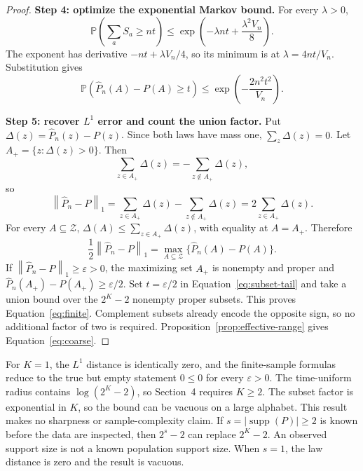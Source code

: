 \documentclass[11pt]{article}
\theoremstyle{definition}
\newcommand{\cZ}{\mathcal{Z}}
\newcommand{\Phat}{\widehat{P}}
\newcommand{\Prb}{\mathbb{P}}
\newcommand{\supp}{\operatorname{supp}}
\newcommand{\normone}[1]{\left\lVert #1\right\rVert_1}
\begin{document}
\begin{proof}
\medskip\noindent\textbf{Step 4: optimize the exponential Markov bound.}
For every $\lambda>0$,
\begin{equation}
  \Prb\!\left(\sum_aS_a\ge nt\right)
  \le
  \exp\!\left(-\lambda nt+\frac{\lambda^2V_n}{8}\right).
\end{equation}
The exponent has derivative $-nt+\lambda V_n/4$, so its minimum is at
$\lambda=4nt/V_n$.  Substitution gives
\begin{equation}\label{eq:subset-tail}
  \Prb\!\left(\Phat_n(A)-P(A)\ge t\right)
  \le
  \exp\!\left(-\frac{2n^2t^2}{V_n}\right).
\end{equation}

\medskip\noindent\textbf{Step 5: recover $L^1$ error and count the union factor.}
Put $\Delta(z)=\Phat_n(z)-P(z)$.  Since both laws have mass one,
$\sum_z\Delta(z)=0$.  Let $A_+=\{z:\Delta(z)>0\}$.  Then
\begin{equation}
  \sum_{z\in A_+}\Delta(z)
  =-\sum_{z\notin A_+}\Delta(z),
\end{equation}
so
\begin{equation}
  \normone{\Phat_n-P}
  =\sum_{z\in A_+}\Delta(z)-\sum_{z\notin A_+}\Delta(z)
  =2\sum_{z\in A_+}\Delta(z).
\end{equation}
For every $A\subseteq\cZ$,
$\Delta(A)\le\sum_{z\in A_+}\Delta(z)$, with equality at $A=A_+$.  Therefore
\begin{equation}\label{eq:tv}
  \frac12\normone{\Phat_n-P}
  =\max_{A\subseteq\cZ}\{\Phat_n(A)-P(A)\}.
\end{equation}
If $\normone{\Phat_n-P}\ge\varepsilon>0$, the maximizing set $A_+$ is nonempty and proper and
$\Phat_n(A_+)-P(A_+)\ge\varepsilon/2$.  Set $t=\varepsilon/2$ in
Equation~\eqref{eq:subset-tail} and take a union bound over the $2^K-2$ nonempty proper subsets.
This proves Equation~\eqref{eq:finite}.  Complement subsets already encode the opposite sign, so
no additional factor of two is required.  Proposition~\ref{prop:effective-range} gives
Equation~\eqref{eq:coarse}.
\end{proof}

For $K=1$, the $L^1$ distance is identically zero, and the finite-sample formulas reduce to the
true but empty statement $0\le0$ for every $\varepsilon>0$.  The time-uniform radius contains
$\log(2^K-2)$, so Section~4 requires $K\ge2$.
The subset factor is exponential in $K$, so the bound can be vacuous on a large alphabet.  This
result makes no sharpness or sample-complexity claim.  If $s=|\supp(P)|\ge2$ is known before the
data are inspected, then $2^s-2$ can replace $2^K-2$.  An observed support size is not a known
population support size.  When $s=1$, the law distance is zero and the result is vacuous.
\end{document}

